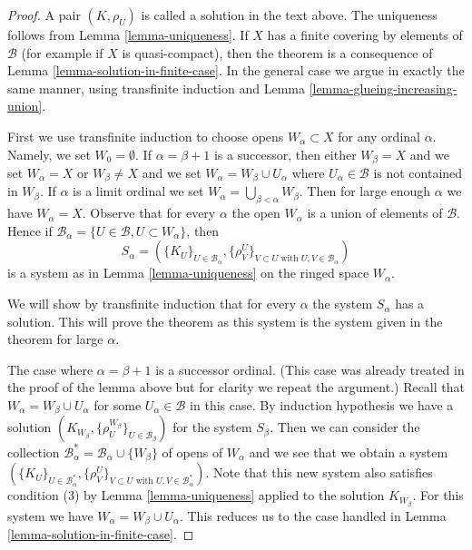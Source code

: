 \begin{proof}
A pair $(K, \rho_U)$ is called a solution in the text above.
The uniqueness follows from Lemma \ref{lemma-uniqueness}.
If $X$ has a finite covering by elements of $\mathcal{B}$
(for example if $X$ is quasi-compact), then the theorem
is a consequence of Lemma \ref{lemma-solution-in-finite-case}.
In the general case we argue in exactly the same manner,
using transfinite induction and
Lemma \ref{lemma-glueing-increasing-union}.

\medskip\noindent
First we use transfinite induction to choose opens $W_\alpha \subset X$
for any ordinal $\alpha$. Namely, we set $W_0 = \emptyset$.
If $\alpha = \beta + 1$ is a successor, then either $W_\beta = X$
and we set $W_\alpha = X$ or $W_\beta \not = X$ and we set
$W_\alpha = W_\beta \cup U_\alpha$ where
$U_\alpha \in \mathcal{B}$ is not contained in $W_\beta$.
If $\alpha$ is a limit ordinal we set
$W_\alpha = \bigcup_{\beta < \alpha} W_\beta$.
Then for large enough $\alpha$ we have $W_\alpha = X$.
Observe that for every $\alpha$ the open $W_\alpha$ is
a union of elements of $\mathcal{B}$. Hence if
$\mathcal{B}_\alpha = \{U \in \mathcal{B}, U \subset W_\alpha\}$, then
$$
S_\alpha = (\{K_U\}_{U \in \mathcal{B}_\alpha},
\{\rho_V^U\}_{V \subset U\text{ with }U, V \in \mathcal{B}_\alpha})
$$
is a system as in Lemma \ref{lemma-uniqueness} on the ringed space $W_\alpha$.

\medskip\noindent
We will show by transfinite induction that for every $\alpha$
the system $S_\alpha$ has a solution. This will prove the theorem
as this system is the system given in the theorem for large $\alpha$.

\medskip\noindent
The case where $\alpha = \beta + 1$ is a successor ordinal.
(This case was already treated in the proof of the lemma above
but for clarity we repeat the argument.)
Recall that $W_\alpha = W_\beta \cup U_\alpha$ for some
$U_\alpha \in \mathcal{B}$ in this case.
By induction hypothesis we have a solution
$(K_{W_\beta}, \{\rho^{W_\beta}_U\}_{U \in \mathcal{B}_\beta})$
for the system $S_\beta$.
Then we can consider the collection
$\mathcal{B}_\alpha^* = \mathcal{B}_\alpha \cup \{W_\beta\}$
of opens of $W_\alpha$ and we see that we obtain a system
$(\{K_U\}_{U \in \mathcal{B}_\alpha^*},
\{\rho_V^U\}_{V \subset U\text{ with }U, V \in \mathcal{B}_\alpha^*})$.
Note that this new system also satisfies condition (3)
by Lemma \ref{lemma-uniqueness} applied to the solution $K_{W_\beta}$.
For this system we have $W_\alpha = W_\beta \cup U_\alpha$.
This reduces us to the case handled in
Lemma \ref{lemma-solution-in-finite-case}.


\end{proof}
